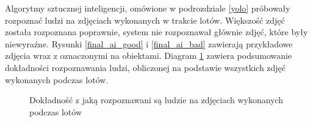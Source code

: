 Algorytmy sztucznej inteligencji, omówione w podrozdziale \ref{yolo} 
próbowały rozpoznać ludzi na zdjęciach wykonanych w trakcie lotów.
Większość zdjęć została rozpoznana poprawnie, system nie rozpoznawał
głównie zdjęć, które były niewyraźne. Rysunki \ref{final_ai_good} i \ref{final_ai_bad}
zawierają przykładowe zdjęcia wraz z oznaczonymi na obiektami.
Diagram \ref{ai_results} zawiera podsumowanie dokładności rozpoznawania
ludzi, obliczonej na podstawie wszystkich zdjęć wykonanych podczas lotów.

\begin{figure}[H]
	\centering

    \caption{
        Dokładność z jaką rozpoznawani są ludzie na zdjęciach wykonanych podczas lotów
    }
	\label{ai_results}
\end{figure}


